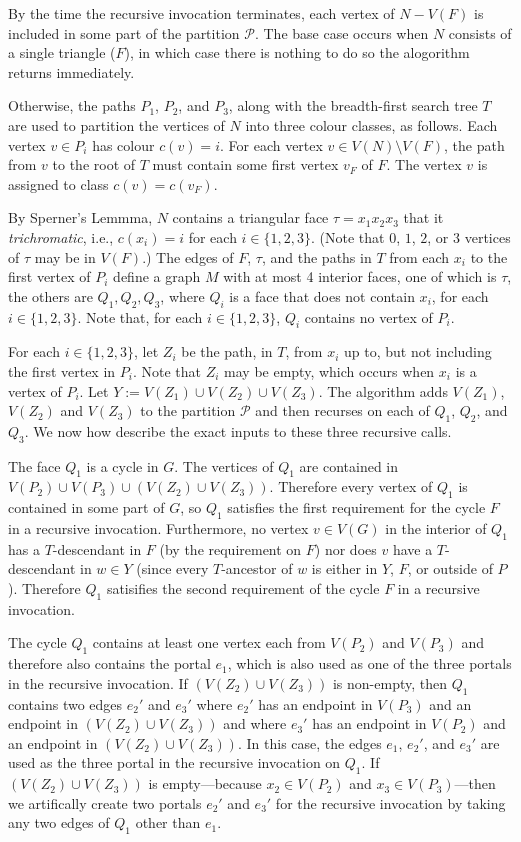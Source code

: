 \documentclass[kpfonts]{patmorin}
\begin{document}
By the time the recursive invocation terminates, each vertex of $N-V(F)$ is included in some part of the partition $\mathcal{P}$. The base case occurs when $N$ consists of a single triangle ($F$), in which case there is nothing to do so the alogorithm returns immediately.

Otherwise, the paths $P_1$, $P_2$, and $P_3$, along with the breadth-first search tree $T$ are used to partition the vertices of $N$ into three colour classes, as follows.  Each vertex $v\in P_i$ has colour $c(v)=i$.  For each vertex $v\in V(N)\setminus V(F)$, the path from $v$ to the root of $T$ must contain some first vertex $v_F$ of $F$.  The vertex $v$ is assigned to class $c(v)=c(v_F)$.

By Sperner's Lemmma, $N$ contains a triangular face $\tau=x_1x_2x_3$ that it \emph{trichromatic}, i.e., $c(x_i)=i$ for each $i\in\{1,2,3\}$. (Note that $0$, $1$, $2$, or $3$ vertices of $\tau$ may be in $V(F)$.)  The edges of $F$, $\tau$, and the paths in $T$ from each $x_i$ to the first vertex of $P_i$ define a graph $M$ with at most 4 interior faces, one of which is $\tau$, the others are $Q_1,Q_2,Q_3$, where $Q_i$ is a face that does not contain $x_i$, for each $i\in\{1,2,3\}$.  Note that, for each $i\in\{1,2,3\}$, $Q_i$ contains no vertex of $P_i$.

For each $i\in\{1,2,3\}$, let $Z_i$ be the path, in $T$, from $x_i$ up to, but not including the first vertex in $P_i$.  Note that $Z_i$ may be empty, which occurs when $x_i$ is a vertex of $P_i$.  Let $Y:=V(Z_1)\cup V(Z_2)\cup V(Z_3)$.  The algorithm adds $V(Z_1)$, $V(Z_2)$ and $V(Z_3)$ to the partition $\mathcal{P}$ and then recurses on each of $Q_1$, $Q_2$, and $Q_3$.  We now how describe the exact inputs to these three recursive calls. 

The face $Q_1$ is a cycle in $G$.  The vertices of $Q_1$ are contained in $V(P_2)\cup V(P_3)\cup (V(Z_2)\cup V(Z_3))$.  Therefore every vertex of $Q_1$ is contained in some part of $G$, so $Q_1$ satisfies the first requirement for the cycle $F$ in a recursive invocation.  Furthermore, no vertex $v\in V(G)$ in the interior of $Q_1$ has a $T$-descendant in $F$ (by the requirement on $F$) nor does $v$ have a $T$-descendant in $w\in Y$ (since every $T$-ancestor of $w$ is either in $Y$, $F$, or outside of $P$).  Therefore $Q_1$ satisifies the second requirement of the cycle $F$ in a recursive invocation.

The cycle $Q_1$ contains at least one vertex each from $V(P_2)$ and $V(P_3)$ and therefore also contains the portal $e_1$, which is also used as one of the three portals in the recursive invocation.  If $(V(Z_2)\cup V(Z_3))$ is non-empty, then $Q_1$ contains two edges $e_2'$ and $e_3'$ where $e_2'$ has an endpoint in $V(P_3)$ and an endpoint in $(V(Z_2)\cup V(Z_3))$ and where $e_3'$ has an endpoint in $V(P_2)$ and an endpoint in $(V(Z_2)\cup V(Z_3))$.  In this case, the edges $e_1$, $e_2'$, and $e_3'$ are used as the three portal in the recursive invocation on $Q_1$.  If $(V(Z_2)\cup V(Z_3))$ is empty---because $x_2\in V(P_2)$ and $x_3\in V(P_3)$---then we artifically create two portals $e_2'$ and $e_3'$ for the recursive invocation by taking any two edges of $Q_1$ other than $e_1$.
\end{document}

